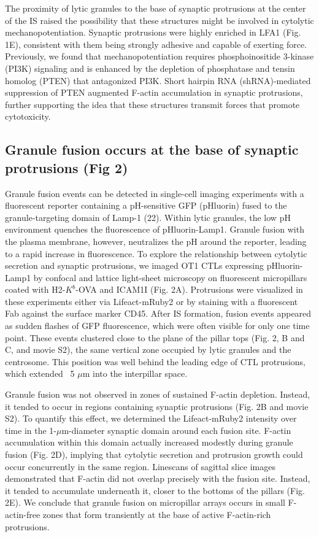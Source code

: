 The proximity of lytic granules to the base of synaptic protrusions at the center of the IS raised the possibility that these structures might be involved in cytolytic mechanopotentiation. Synaptic protrusions were highly enriched in LFA1 (Fig. 1E), consistent with them being strongly adhesive and capable of exerting force. Previously, we found that mechanopotentiation requires phosphoinositide 3-kinase (PI3K) signaling and is enhanced by the depletion of phosphatase and tensin homolog (PTEN) that antagonized PI3K. Short hairpin RNA (shRNA)-mediated suppression of PTEN augmented F-actin accumulation in synaptic protrusions, further supporting the idea that these structures transmit forces that promote cytotoxicity.

\subsection{Granule fusion occurs at the base of synaptic protrusions (Fig 2)}
Granule fusion events can be detected in single-cell imaging experiments with a fluorescent reporter containing a pH-sensitive GFP (pHluorin) fused to the granule-targeting domain of Lamp-1 (22). Within lytic granules, the low pH environment quenches the fluorescence of pHluorin-Lamp1. Granule fusion with the plasma membrane, however, neutralizes the pH around the reporter, leading to a rapid increase in fluorescence. To explore the relationship between cytolytic secretion and synaptic protrusions, we imaged OT1 CTLs expressing pHluorin-Lamp1 by confocal and lattice  light-sheet
microscopy on fluorescent micropillars coated with H2-$K^{b}$-OVA and ICAM1I (Fig. 2A). Protrusions were visualized in these experiments either via Lifeact-mRuby2 or by staining with a fluorescent Fab against the surface marker CD45. After IS formation, fusion events appeared as sudden flashes of GFP fluorescence, which were often visible for only one time point. These events clustered close to the plane of the pillar tops (Fig. 2, B and C, and movie S2), the same vertical zone occupied by lytic granules and the centrosome. This position was well behind the leading edge of CTL protrusions, which extended ~5 $\mu$m into the interpillar space.


Granule fusion was not observed in zones of sustained F-actin depletion. Instead, it tended to occur in regions containing synaptic protrusions (Fig. 2B and movie S2). To quantify this effect, we determined the Lifeact-mRuby2 intensity over time in the 1-$\mu$m-diameter synaptic domain around each fusion site. F-actin accumulation within this domain actually increased modestly during granule fusion (Fig. 2D), implying that cytolytic secretion and protrusion growth could occur concurrently in the same region. Linescans of sagittal slice images demonstrated that F-actin did not overlap precisely with the fusion site. Instead, it tended to accumulate underneath it, closer to the bottoms of the pillars (Fig. 2E). We conclude that granule fusion on micropillar arrays occurs in small F-actin-free zones that form transiently at the base of active F-actin-rich protrusions.

